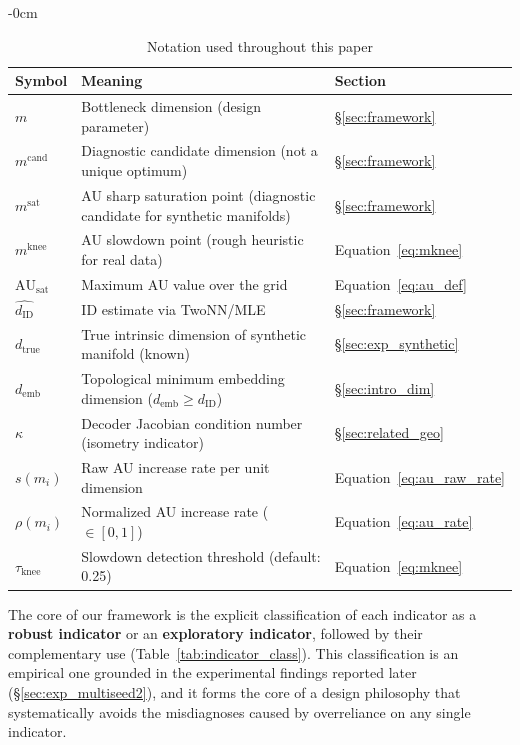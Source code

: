 \documentclass[make,article,submit,pdftex,moreauthors]{Definitions/mdpi}
\newcommand{\dID}{d_{\mathrm{ID}}}
\newcommand{\dzopt}{m^{\mathrm{cand}}}
\newcommand{\dtrue}{d_{\mathrm{true}}}
\newcommand{\kap}{\kappa}
\newcommand{\AUsat}{\mathrm{AU}_{\mathrm{sat}}}
\newcommand{\dzsat}{m^{\mathrm{sat}}}
\newcommand{\mknee}{m^{\mathrm{knee}}}
\newcommand{\demb}{d_{\mathrm{emb}}}
\begin{document}
\begin{table}[H]
\begin{adjustwidth}{-\extralength}{0cm}
\centering
\caption{Notation used throughout this paper}
\label{tab:notation}
\small
\begin{tabular}{lll}
\toprule
Symbol & Meaning & Section \\
\midrule
$m$ & Bottleneck dimension (design parameter) & §\ref{sec:framework} \\
$\dzopt$ & Diagnostic candidate dimension (not a unique optimum) & §\ref{sec:framework} \\
$\dzsat$ & AU sharp saturation point (diagnostic candidate for synthetic manifolds) & §\ref{sec:framework} \\
$\mknee$ & AU slowdown point (rough heuristic for real data) & Equation~\eqref{eq:mknee} \\
$\AUsat$ & Maximum AU value over the grid & Equation~\eqref{eq:au_def} \\
$\hat{\dID}$ & ID estimate via TwoNN/MLE & §\ref{sec:framework} \\
$\dtrue$ & True intrinsic dimension of synthetic manifold (known) & §\ref{sec:exp_synthetic} \\
$\demb$ & Topological minimum embedding dimension ($\demb \geq \dID$) & §\ref{sec:intro_dim} \\
$\kap$ & Decoder Jacobian condition number (isometry indicator) & §\ref{sec:related_geo} \\
$s(m_i)$ & Raw AU increase rate per unit dimension & Equation~\eqref{eq:au_raw_rate} \\
$\rho(m_i)$ & Normalized AU increase rate ($\in[0,1]$) & Equation~\eqref{eq:au_rate} \\
$\tau_{\mathrm{knee}}$ & Slowdown detection threshold (default: 0.25) & Equation~\eqref{eq:mknee} \\
\bottomrule
\end{tabular}
\end{adjustwidth}
\end{table}

The core of our framework is the explicit classification of each indicator as a
\textbf{robust indicator} or an \textbf{exploratory indicator}, followed by their
complementary use (Table~\ref{tab:indicator_class}).
This classification is an empirical one grounded in the experimental findings
reported later (§\ref{sec:exp_multiseed2}), and it forms the core of a design
philosophy that systematically avoids the misdiagnoses caused by overreliance on
any single indicator.
\end{document}
